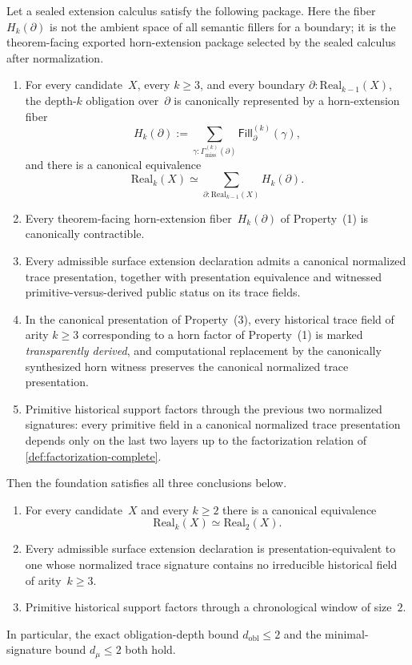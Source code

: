 \documentclass{lmcs}
\newcommand{\Real}{\mathrm{Real}}
\begin{document}
\begin{thm}
\label{thm:horn-interface}
Let a sealed extension calculus satisfy the following package. Here the fiber
$H_k(\partial)$ is not the ambient space of all semantic fillers for a boundary;
it is the theorem-facing exported horn-extension package selected by the sealed
calculus after normalization.
\begin{enumerate}
  \item For every candidate~$X$, every $k \geq 3$, and every boundary $\partial : \Real_{k-1}(X)$, the depth-$k$ obligation over~$\partial$ is canonically represented by a horn-extension fiber
  \[
    H_k(\partial)
    :=
    \sum_{\gamma : \Gamma^{(k)}_{\mathrm{miss}}(\partial)}
    \mathsf{Fill}^{(k)}_{\partial}(\gamma),
  \]
  and there is a canonical equivalence
  \[
    \Real_k(X)
    \simeq
    \sum_{\partial : \Real_{k-1}(X)} H_k(\partial).
  \]
  \item Every theorem-facing horn-extension fiber~$H_k(\partial)$ of Property~(1) is canonically contractible.
  \item Every admissible surface extension declaration admits a canonical normalized trace presentation, together with presentation equivalence and witnessed primitive-versus-derived public status on its trace fields.
  \item In the canonical presentation of Property~(3), every historical trace field of arity $k \geq 3$ corresponding to a horn factor of Property~(1) is marked \emph{transparently derived}, and computational replacement by the canonically synthesized horn witness preserves the canonical normalized trace presentation.
  \item Primitive historical support factors through the previous two normalized signatures: every primitive field in a canonical normalized trace presentation depends only on the last two layers up to the factorization relation of \autoref{def:factorization-complete}.
\end{enumerate}
Then the foundation satisfies all three conclusions below.
\begin{enumerate}
  \item For every candidate~$X$ and every $k \geq 2$ there is a canonical equivalence
  \[
    \Real_k(X) \simeq \Real_2(X).
  \]
  \item Every admissible surface extension declaration is presentation-equivalent to one whose normalized trace signature contains no irreducible historical field of arity~$k \geq 3$.
  \item Primitive historical support factors through a chronological window of size~$2$.
\end{enumerate}
In particular, the exact obligation-depth bound $d_{\mathrm{obl}} \leq 2$ and the minimal-signature bound $d_\mu \leq 2$ both hold.
\end{thm}
\end{document}
